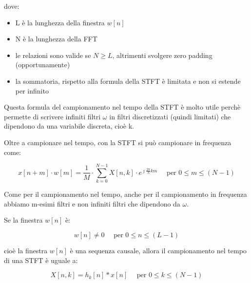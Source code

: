 dove: 

\begin{itemize}
    \item L è la lunghezza della finestra $w \left[ n\right]$
    \item N è la lunghezza della FFT 
    \item le relazioni sono valide se $N \geq L$, altrimenti svolgere zero padding (opportunamente)
    \item la sommatoria, rispetto alla formula della STFT è limitata e non si estende per infinito 
\end{itemize} 

Questa formula del campionamento nel tempo della STFT è molto utile perchè permette di scrivere infiniti filtri $\omega$ in filtri discretizzati (quindi limitati) che dipendono da una variabile discreta, 
cioè k. \newline 

Oltre a campionare nel tempo, con la STFT si può campionare in frequenza come: 

{
    \Large 
    \begin{equation}
        x \left[ n + m\right]
        \cdot 
        w \left[ m\right] 
        = 
        \dfrac{1}{M}
        \cdot 
        \sum_{k = 0}^{N - 1}
        X \left[ n, k\right]
        \cdot 
        e^{\jmath \frac{2 \pi}{N} k m}
        \quad 
        \text{ per }
        0 \leq m \leq \left(N - 1\right)
    \end{equation}
}

Come per il campionamento nel tempo, anche per il campionamento in frequenza abbiamo m-esimi filtri e non infiniti filtri che dipendono da $\omega$. \newline 

Se la finestra $w \left[ n\right]$ è: 

{
    \Large 
    \begin{equation}
        w \left[ n\right] \neq 0 
        \quad
        \text{ per }
        0 \leq n \leq \left(L - 1\right)
    \end{equation}
}

cioè la finestra $w \left[ n\right]$ è una sequenza causale, allora il campionamento nel tempo di una STFT è uguale a: 

{
    \Large 
    \begin{equation}
        X \left[ n, k\right]
        = 
        h_{k} \left[ n\right] * x \left[ n\right]
        \quad
        \text{ per }
        0 \leq k \leq \left(N - 1\right)
    \end{equation}
}

